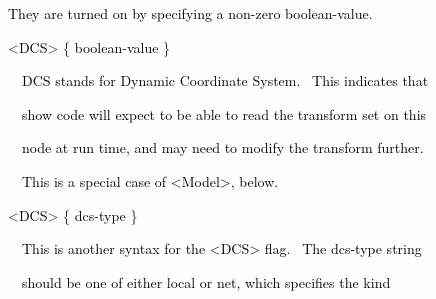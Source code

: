 \documentclass[a4paper]{article}
\newcommand\textstyleOOoComputerKeyWord[1]{\textrm{\textcolor[rgb]{0.0,0.0,0.5019608}{#1}}}
\newcommand\textstyleOOoAssemblerSpecialChar[1]{\textrm{\textcolor[rgb]{0.0,0.5019608,0.0}{#1}}}
\newcommand\textstyleOOoAssemblerIdent[1]{\textrm{\textcolor{black}{#1}}}
\begin{document}
{\color{black}
\textstyleOOoComputerKeyWord{\textcolor{black}{\ \ They are turned on by specifying a non-zero
{\textquotedbl}boolean-value{\textquotedbl}.}}}


\bigskip

{\color{black}
\textstyleOOoComputerKeyWord{\textcolor{black}{\ \ }}\textstyleOOoAssemblerSpecialChar{{\textless}}\textstyleOOoAssemblerIdent{DCS}\textstyleOOoAssemblerSpecialChar{{\textgreater}}\textstyleOOoComputerKeyWord{\textcolor{black}{
}}\textstyleOOoAssemblerSpecialChar{\{}\textstyleOOoComputerKeyWord{\textcolor{black}{
}}\textstyleOOoAssemblerIdent{boolean}\textstyleOOoAssemblerSpecialChar{{}-}\textstyleOOoAssemblerIdent{value}\textstyleOOoComputerKeyWord{\textcolor{black}{
}}\textstyleOOoAssemblerSpecialChar{\}}}


\bigskip

{\color{black}
\textstyleOOoComputerKeyWord{\textcolor{black}{\ \ \ \ DCS stands for Dynamic Coordinate System. \ This indicates
that}}}

{\color{black}
\textstyleOOoComputerKeyWord{\textcolor{black}{\ \ \ \ show code will expect to be able to read the transform set on
this}}}

{\color{black}
\textstyleOOoComputerKeyWord{\textcolor{black}{\ \ \ \ node at run time, and may need to modify the transform
further.}}}

{\color{black}
\textstyleOOoComputerKeyWord{\textcolor{black}{\ \ \ \ This is a special case of {\textless}Model{\textgreater},
below.}}}


\bigskip

{\color{black}
\textstyleOOoComputerKeyWord{\textcolor{black}{\ \ }}\textstyleOOoAssemblerSpecialChar{{\textless}}\textstyleOOoAssemblerIdent{DCS}\textstyleOOoAssemblerSpecialChar{{\textgreater}}\textstyleOOoComputerKeyWord{\textcolor{black}{
}}\textstyleOOoAssemblerSpecialChar{\{}\textstyleOOoComputerKeyWord{\textcolor{black}{
}}\textstyleOOoAssemblerIdent{dcs}\textstyleOOoAssemblerSpecialChar{{}-}\textstyleOOoAssemblerIdent{type}\textstyleOOoComputerKeyWord{\textcolor{black}{
}}\textstyleOOoAssemblerSpecialChar{\}}}


\bigskip

{\color{black}
\textstyleOOoComputerKeyWord{\textcolor{black}{\ \ \ \ This is another syntax for the {\textless}DCS{\textgreater} flag.
\ The dcs-type string}}}

{\color{black}
\textstyleOOoComputerKeyWord{\textcolor{black}{\ \ \ \ should be one of either {\textquotedbl}local{\textquotedbl} or
{\textquotedbl}net{\textquotedbl}, which specifies the kind}}}
\end{document}
